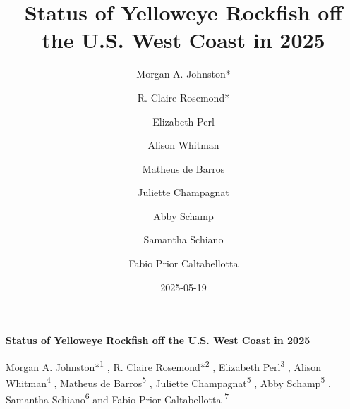 \documentclass[
]{scrartcl}
\title{Status of Yelloweye Rockfish off the U.S. West Coast in 2025}
\author{Morgan A. Johnston* \and R. Claire Rosemond* \and Elizabeth
Perl \and Alison Whitman \and Matheus de Barros \and Juliette
Champagnat \and Abby Schamp \and Samantha Schiano \and Fabio Prior
Caltabellotta}
\date{2025-05-19}
\begin{document}
  \begin{titlepage}

  \begin{minipage}[b][\textheight][s]{\textwidth}


  \raggedright




  {\huge\bfseries\nohyphens{Status of Yelloweye Rockfish off the U.S.
  West Coast in 2025}}\\[1\baselineskip]



  \vspace{1\baselineskip}


  \vspace{1\baselineskip}

   {\large{Morgan A. Johnston*}}{\textsuperscript{1}}%
  ,
   {\large{R. Claire Rosemond*}}{\textsuperscript{2}}%
  ,
   {\large{Elizabeth Perl}}{\textsuperscript{3}}%
  ,
   {\large{Alison Whitman}}{\textsuperscript{4}}%
  ,
   {\large{Matheus de Barros}}{\textsuperscript{5}}%
  ,
   {\large{Juliette Champagnat}}{\textsuperscript{5}}%
  ,
   {\large{Abby Schamp}}{\textsuperscript{5}}%
  ,
   {\large{Samantha Schiano}}{\textsuperscript{6}}%
  { and \large{Fabio Prior Caltabellotta}}%
  {\textsuperscript{7}}%



\end{minipage}
\end{titlepage}
\end{document}

